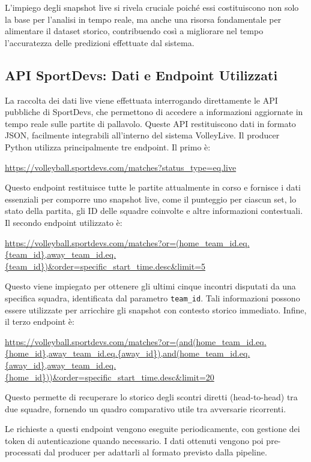 \documentclass[a4paper,12pt]{report}
\begin{document}
L’impiego degli snapshot live si rivela cruciale poiché essi costituiscono non solo la base per l’analisi in tempo reale, ma anche una risorsa fondamentale per alimentare il dataset storico, contribuendo così a migliorare nel tempo l’accuratezza delle predizioni effettuate dal sistema.


\subsection{API SportDevs: Dati e Endpoint Utilizzati}

La raccolta dei dati live viene effettuata interrogando direttamente le API pubbliche di SportDevs, che permettono di accedere a informazioni aggiornate in tempo reale sulle partite di pallavolo. Queste API restituiscono dati in formato JSON, facilmente integrabili all'interno del sistema VolleyLive.
Il producer Python utilizza principalmente tre endpoint. Il primo è:

\url{https://volleyball.sportdevs.com/matches?status_type=eq.live}

Questo endpoint restituisce tutte le partite attualmente in corso e fornisce i dati essenziali per comporre uno snapshot live, come il punteggio per ciascun set, lo stato della partita, gli ID delle squadre coinvolte e altre informazioni contestuali.
Il secondo endpoint utilizzato è:

\url{https://volleyball.sportdevs.com/matches?or=(home_team_id.eq.{team_id},away_team_id.eq.{team_id})&order=specific_start_time.desc&limit=5}

Questo viene impiegato per ottenere gli ultimi cinque incontri disputati da una specifica squadra, identificata dal parametro \texttt{team\_id}. Tali informazioni possono essere utilizzate per arricchire gli snapshot con contesto storico immediato.
Infine, il terzo endpoint è:

\url{https://volleyball.sportdevs.com/matches?or=(and(home_team_id.eq.{home_id},away_team_id.eq.{away_id}),and(home_team_id.eq.{away_id},away_team_id.eq.{home_id}))&order=specific_start_time.desc&limit=20}

Questo permette di recuperare lo storico degli scontri diretti (head-to-head) tra due squadre, fornendo un quadro comparativo utile tra avversarie ricorrenti.

Le richieste a questi endpoint vengono eseguite periodicamente, con gestione dei token di autenticazione quando necessario. I dati ottenuti vengono poi pre-processati dal producer per adattarli al formato previsto dalla pipeline.
\end{document}
